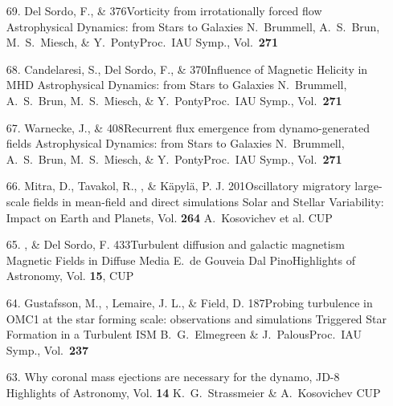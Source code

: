 \begin{itemize}
\item[69.]
Del Sordo, F., \& \Brandenburg{}
{376}{Vorticity from irrotationally forced flow}
{Astrophysical Dynamics: from Stars to Galaxies}
{N.\ Brummell, A.\ S.\ Brun, M.\ S.\ Miesch, \& Y.\ Ponty}{Proc.\ IAU Symp., Vol.\ {\bf 271}}

\item[68.]
Candelaresi, S., Del Sordo, F., \& \Brandenburg{}
{370}{Influence of Magnetic Helicity in MHD}
{Astrophysical Dynamics: from Stars to Galaxies}
{N.\ Brummell, A.\ S.\ Brun, M.\ S.\ Miesch, \& Y.\ Ponty}{Proc.\ IAU Symp., Vol.\ {\bf 271}}

\item[67.]
Warnecke, J., \& \Brandenburg{}
{408}{Recurrent flux emergence from dynamo-generated fields}
{Astrophysical Dynamics: from Stars to Galaxies}
{N.\ Brummell, A.\ S.\ Brun, M.\ S.\ Miesch, \& Y.\ Ponty}{Proc.\ IAU Symp., Vol.\ {\bf 271}}

\item[66.]
Mitra,  D., Tavakol, R., \Brandenburg, \& K\"apyl\"a, P. J.
{201}{Oscillatory migratory large-scale fields in mean-field and direct simulations}
{Solar and Stellar Variability: Impact on Earth and Planets, Vol. {\bf 264}}
{A.\ Kosovichev et al.}
{CUP}

\item[65.]
\Brandenburg, \& Del Sordo, F.
{433}{Turbulent diffusion and galactic magnetism}
{Magnetic Fields in Diffuse Media}
{E.\ de Gouveia Dal Pino}{Highlights of Astronomy, Vol. {\bf 15}, CUP}

\item[64.]
Gustafsson, M., \Brandenburg, Lemaire, J. L., \&
Field, D.
{187}{Probing turbulence in OMC1 at the star forming scale: observations and simulations}
{Triggered Star Formation in a Turbulent ISM}
{B.\ G.\ Elmegreen \& J.\ Palous}{Proc.\ IAU Symp., Vol.\ {\bf 237}}

\item[63.]
\Brandenburg{}
{Why coronal mass ejections are necessary for the dynamo, JD-8}
{Highlights of Astronomy, Vol. {\bf 14}}
{K.\ G.\ Strassmeier \& A.\ Kosovichev}
{CUP}


\end{itemize}
